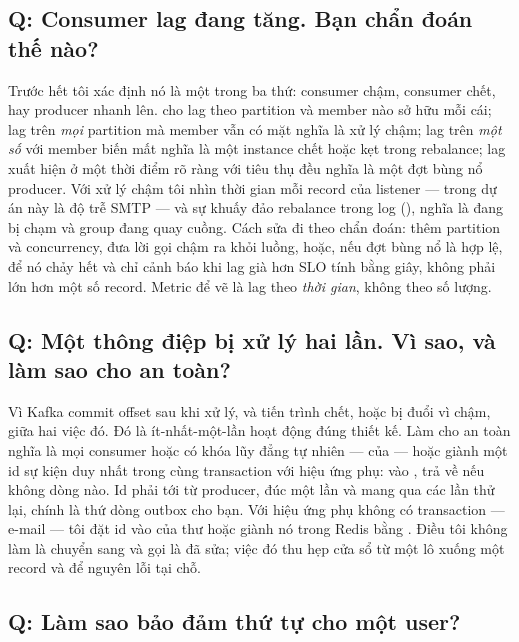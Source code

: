 \subsection*{Q: Consumer lag đang tăng. Bạn chẩn đoán thế nào?}

Trước hết tôi xác định nó là một trong ba thứ: consumer chậm, consumer
chết, hay producer nhanh lên.  cho lag theo partition và member nào sở hữu
mỗi cái; lag trên \emph{mọi} partition mà member vẫn có mặt nghĩa là xử
lý chậm; lag trên \emph{một số} với member biến mất nghĩa là một
instance chết hoặc kẹt trong rebalance; lag xuất hiện ở một thời điểm rõ
ràng với tiêu thụ đều nghĩa là một đợt bùng nổ producer. Với xử lý chậm
tôi nhìn thời gian mỗi record của listener --- trong dự án này là độ trễ
SMTP --- và sự khuấy đảo rebalance trong log (), nghĩa là  đang bị chạm và group đang
quay cuồng. Cách sửa đi theo chẩn đoán: thêm partition và concurrency,
đưa lời gọi chậm ra khỏi luồng, hoặc, nếu đợt bùng nổ là hợp lệ, để nó
chảy hết và chỉ cảnh báo khi lag già hơn SLO tính bằng giây, không phải
lớn hơn một số record. Metric để vẽ là lag theo \emph{thời gian}, không
theo số lượng.

\subsection*{Q: Một thông điệp bị xử lý hai lần. Vì sao, và làm sao cho an toàn?}

Vì Kafka commit offset sau khi xử lý, và tiến trình chết, hoặc bị đuổi
vì chậm, giữa hai việc đó. Đó là ít-nhất-một-lần hoạt động đúng thiết
kế. Làm cho an toàn nghĩa là mọi consumer hoặc có khóa lũy đẳng tự
nhiên ---  của  --- hoặc
giành một id sự kiện duy nhất trong cùng transaction với hiệu ứng phụ:
 vào ,
trả về nếu không dòng nào. Id phải tới từ producer, đúc một lần và mang
qua các lần thử lại, chính là thứ dòng outbox cho bạn. Với hiệu ứng phụ
không có transaction --- e-mail --- tôi đặt id vào  của
thư hoặc giành nó trong Redis bằng . Điều tôi không làm là
chuyển sang  và gọi là đã sửa; việc đó thu hẹp cửa
sổ từ một lô xuống một record và để nguyên lỗi tại chỗ.

\subsection*{Q: Làm sao bảo đảm thứ tự cho một user?}

